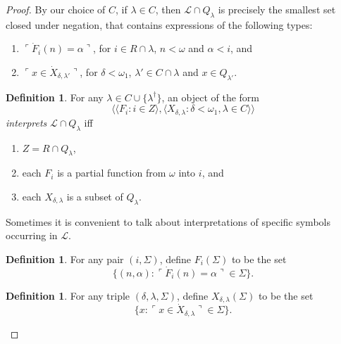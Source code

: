 \documentclass[12pt, twoside]{memoir}
\numberwithin{equation}{section}
\theoremstyle{definition}
\newtheorem{defi}[thm]{Definition}
\theoremstyle{remark}
\theoremstyle{definition}
\theoremstyle{definition}
\theoremstyle{definition}
\theoremstyle{remark}
\begin{document}
\begin{proof}
By our choice of $C$, if $\lambda \in C$, then $\mathcal{L} \cap Q_{\lambda}$ is precisely the smallest set closed under negation, that contains expressions of the following types: 
\begin{enumerate}[label=(L\arabic*)$_{\lambda}$, leftmargin=45pt]
    \item\label{l1lamb} $\ulcorner \dot{F}_i (n) = \alpha \urcorner$, for $i \in R \cap \lambda$, $n < \omega$ and $\alpha < i$, and
    \item\label{l2lamb} $\ulcorner x \in \dot{X}_{\delta, \lambda'} \urcorner$, for $\delta < \omega_1$, $\lambda' \in C \cap \lambda$ and $x \in Q_{\lambda'}$.
\end{enumerate}

\begin{defi}\label{def412}
For any $\lambda \in C \cup \{\lambda^{\dagger}\}$, an object of the form $$\langle \langle F_i : i \in Z \rangle, \langle X_{\delta, \lambda} : \delta < \omega_1, \lambda \in C \rangle \rangle$$ \emph{interprets} $\mathcal{L} \cap Q_{\lambda}$ iff 
\begin{enumerate}[label=(\alph*)]
    \item $Z = R \cap Q_{\lambda}$,
    \item each $F_i$ is a partial function from $\omega$ into $i$, and 
    \item each $X_{\delta, \lambda}$ is a subset of $Q_{\lambda}$. 
\end{enumerate}
\end{defi}

Sometimes it is convenient to talk about interpretations of specific symbols occurring in $\mathcal{L}$.

\begin{defi}
For any pair $(i, \Sigma)$, define $F_i(\Sigma)$ to be the set $$\{(n, \alpha) : \ulcorner \dot{F}_i(n) = \alpha \urcorner \in \Sigma\}.$$
\end{defi}

\begin{defi}
For any triple $(\delta, \lambda, \Sigma)$, define $X_{\delta, \lambda}(\Sigma)$ to be the set $$\{x : \ulcorner x \in \dot{X}_{\delta, \lambda} \urcorner \in \Sigma\}.$$
\end{defi}


\end{proof}
\end{document}
